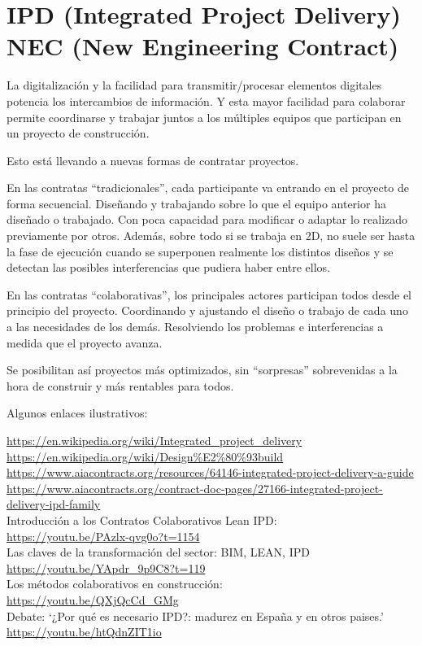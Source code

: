 \documentclass[spanish,12pt,a4paper,final,oneside]{book}
\begin{document}
\section{IPD (Integrated Project Delivery) \\ NEC (New Engineering Contract)}

La digitalización y la facilidad para transmitir/procesar elementos digitales potencia los intercambios de información.  Y esta mayor facilidad para colaborar permite coordinarse y trabajar juntos a los múltiples equipos que participan en un proyecto de construcción.

Esto está llevando a nuevas formas de contratar proyectos.

En las contratas ``tradicionales'', cada participante va entrando en el proyecto de forma secuencial. Diseñando y trabajando sobre lo que el equipo anterior ha diseñado o trabajado. Con poca capacidad para modificar o adaptar lo realizado previamente por otros. Además, sobre todo si se trabaja en 2D, no suele ser hasta la fase de ejecución cuando se superponen realmente los distintos diseños y se detectan las posibles interferencias que pudiera haber entre ellos.

En las contratas ``colaborativas'', los principales actores participan todos desde el principio del proyecto. Coordinando y ajustando el diseño o trabajo de cada uno a las necesidades de los demás. Resolviendo los problemas e interferencias a medida que el proyecto avanza.

Se posibilitan así proyectos más optimizados, sin ``sorpresas'' sobrevenidas a la hora de construir y más rentables para todos.

Algunos enlaces ilustrativos:

\url{https://en.wikipedia.org/wiki/Integrated_project_delivery}
\\ \url{https://en.wikipedia.org/wiki/Design%E2%80%93build}
\\ \url{https://www.aiacontracts.org/resources/64146-integrated-project-delivery-a-guide}
\\ \url{https://www.aiacontracts.org/contract-doc-pages/27166-integrated-project-delivery-ipd-family}
\\ Introducción a los Contratos Colaborativos Lean IPD:
\\ \url{https://youtu.be/PAzlx-qvg0o?t=1154}
\\ Las claves de la transformación del sector: BIM, LEAN, IPD 
\\ \url{https://youtu.be/YApdr_9p9C8?t=119}
\\ Los métodos colaborativos en construcción:
\\ \url{https://youtu.be/QXjQcCd_GMg}
\\ Debate: `¿Por qué es necesario IPD?: madurez en España y en otros paises.'
\\ \url{https://youtu.be/htQdnZIT1io}
\end{document}
